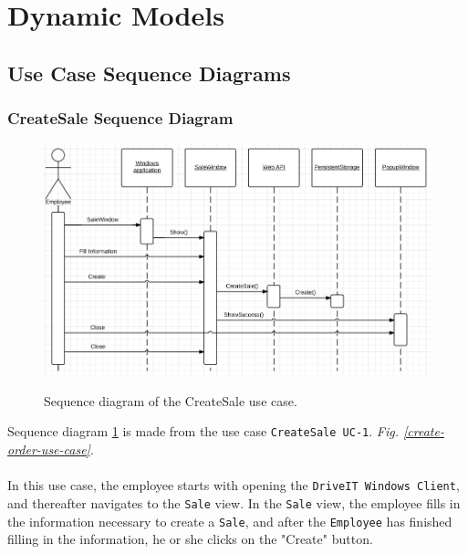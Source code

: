 \section{Dynamic Models}

\subsection{Use Case Sequence Diagrams}
\subsubsection{CreateSale Sequence Diagram}
\begin{figure}[H]
	\centering
		\includegraphics[width=\textwidth]{Figures/SequenceDiagram-CreateSale}\\
	\caption{Sequence diagram of the CreateSale use case.}
  \label{fig:SequenceDiagram-CreateSale}
\end{figure}

Sequence diagram \ref{fig:SequenceDiagram-CreateSale} is made from the use case \texttt{CreateSale UC-1}. \textit{Fig. \ref{create-order-use-case}}. \\\\
In this use case, the employee starts with opening the \texttt{DriveIT Windows Client}, and thereafter navigates to the \texttt{Sale} view. In the \texttt{Sale} view, the employee fills in the information necessary to create a \texttt{Sale}, and after the \texttt{Employee} has finished filling in the information, he or she clicks on the "Create" button.

